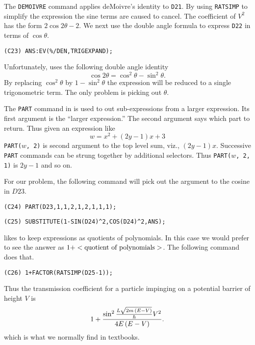The {\tt DEMOIVRE} command applies deMoivre's identity to {\tt D21}.  By
using {\tt RATSIMP} to simplify the expression the sine terms are caused to
cancel.  The coefficient of $V^2$ has the form $2 \cos 2 \theta - 2$.  We
next use the double angle formula to express {\tt D22} in terms of $\cos
\theta$.

\begin{verbatim}
(C23) ANS:EV(%/DEN,TRIGEXPAND);
\end{verbatim}
Unfortunately, {\Macsyma} uses the following double angle identity
\[
\cos 2\theta = \cos^2 \theta - \sin^2 \theta.
\]
By replacing $\cos^2 \theta$ by $1 - \sin^2 \theta$ the expression will be
reduced to a single trigonometric term.  The only problem is picking out
$\theta$.  

The {\tt PART} command in {\Macsyma} is used to out sub-expressions from
a larger expression.  Its first argument is the ``larger expression.''
The second argument says which part to return.  Thus given an
expression like
\[
w = x^2 + (2y - 1) x + 3
\]
{\tt PART($w$, 2)} is second argument to the top level sum, viz.,
$(2y-1) x$.  Successive {\tt PART} commands can be strung together by
additional selectors.  Thus {\tt PART($w$, 2, 1)} is $2y-1$ and so on.

For our problem, the following command will pick out the argument to the
cosine in $D23$.

\begin{verbatim}
(C24) PART(D23,1,1,2,1,2,1,1,1);
\end{verbatim} 
\begin{verbatim}
(C25) SUBSTITUTE(1-SIN(D24)^2,COS(D24)^2,ANS);
\end{verbatim}
{\Macsyma} likes to keep expressions as quotients of polynomials.  In this case
we would prefer to see the answer as $1 + <\hbox{quotient of polynomials}>$.
The following command does that. 
\begin{verbatim}
(C26) 1+FACTOR(RATSIMP(D25-1));
\end{verbatim}
Thus the transmission coefficient for a particle impinging on a potential
barrier of height $V$ is
\[
1 + {\sin^2 {L \sqrt{2 m\,(E - V)} \over \hbar} V^2 \over 4 E \, (E - V)}.
\]
which is what we normally find in textbooks.

